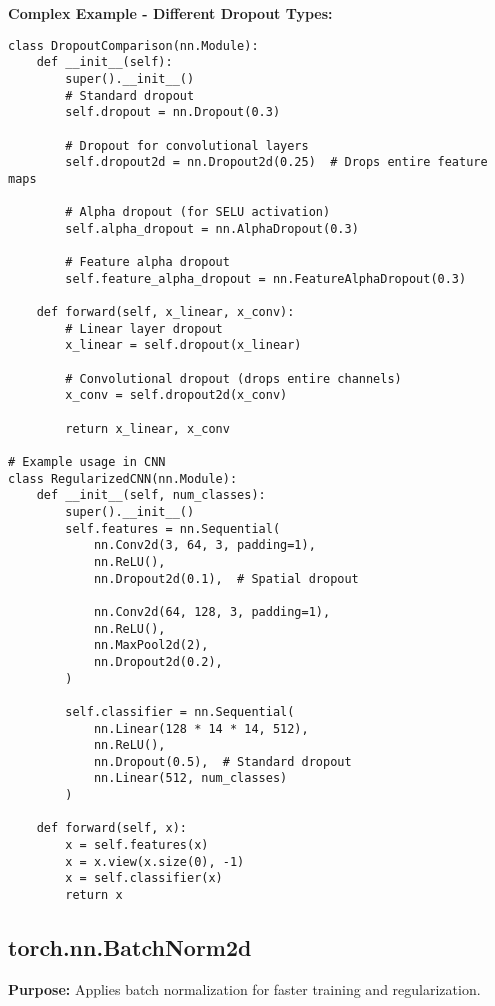 \documentclass[11pt,a4paper]{book}
\begin{document}
\textbf{Complex Example - Different Dropout Types:}
\begin{verbatim}
class DropoutComparison(nn.Module):
    def __init__(self):
        super().__init__()
        # Standard dropout
        self.dropout = nn.Dropout(0.3)
        
        # Dropout for convolutional layers
        self.dropout2d = nn.Dropout2d(0.25)  # Drops entire feature maps
        
        # Alpha dropout (for SELU activation)
        self.alpha_dropout = nn.AlphaDropout(0.3)
        
        # Feature alpha dropout
        self.feature_alpha_dropout = nn.FeatureAlphaDropout(0.3)
    
    def forward(self, x_linear, x_conv):
        # Linear layer dropout
        x_linear = self.dropout(x_linear)
        
        # Convolutional dropout (drops entire channels)
        x_conv = self.dropout2d(x_conv)
        
        return x_linear, x_conv

# Example usage in CNN
class RegularizedCNN(nn.Module):
    def __init__(self, num_classes):
        super().__init__()
        self.features = nn.Sequential(
            nn.Conv2d(3, 64, 3, padding=1),
            nn.ReLU(),
            nn.Dropout2d(0.1),  # Spatial dropout
            
            nn.Conv2d(64, 128, 3, padding=1),
            nn.ReLU(),
            nn.MaxPool2d(2),
            nn.Dropout2d(0.2),
        )
        
        self.classifier = nn.Sequential(
            nn.Linear(128 * 14 * 14, 512),
            nn.ReLU(),
            nn.Dropout(0.5),  # Standard dropout
            nn.Linear(512, num_classes)
        )
    
    def forward(self, x):
        x = self.features(x)
        x = x.view(x.size(0), -1)
        x = self.classifier(x)
        return x
\end{verbatim}

\subsection{torch.nn.BatchNorm2d}

\textbf{Purpose:} Applies batch normalization for faster training and regularization.
\end{document}
